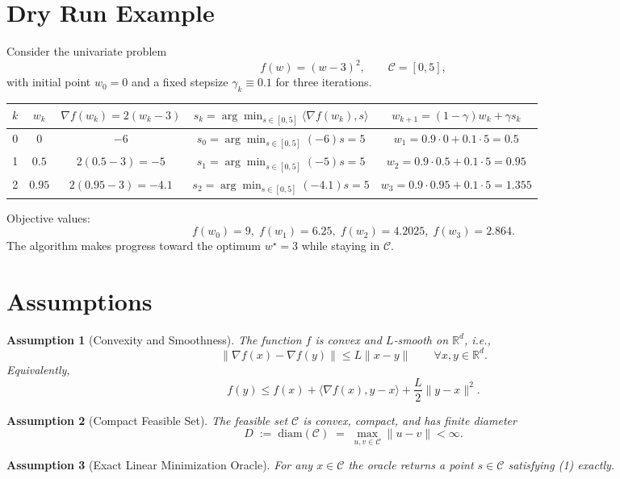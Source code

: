 \documentclass{article}
\newtheorem{assumption}{Assumption}
\newcommand{\diam}{\mathrm{diam}}
\begin{document}
\section*{Dry Run Example}
Consider the univariate problem
\[
f(w) = (w-3)^2 ,\qquad \mathcal{C}= [0,5],
\]
with initial point $w_0=0$ and a fixed stepsize $\gamma_k\equiv 0.1$ for three iterations.

\begin{center}
\begin{tabular}{c|c|c|c|c}
$k$ & $w_k$ & $\nabla f(w_k)=2(w_k-3)$ & $s_k=\arg\min_{s\in[0,5]}\langle\nabla f(w_k),s\rangle$ & $w_{k+1}=(1-\gamma)w_k+\gamma s_k$\\\hline
0 & $0$ & $-6$ & $\displaystyle s_0=\arg\min_{s\in[0,5]}(-6)s=5$ & $w_1=0.9\cdot0+0.1\cdot5=0.5$\\[4pt]
1 & $0.5$ & $2(0.5-3)=-5$ & $s_1=\arg\min_{s\in[0,5]}(-5)s=5$ & $w_2=0.9\cdot0.5+0.1\cdot5=0.95$\\[4pt]
2 & $0.95$ & $2(0.95-3)=-4.1$ & $s_2=\arg\min_{s\in[0,5]}(-4.1)s=5$ & $w_3=0.9\cdot0.95+0.1\cdot5=1.355$\\
\end{tabular}
\end{center}

Objective values:
\[
f(w_0)=9,\; f(w_1)=6.25,\; f(w_2)=4.2025,\; f(w_3)=2.864.
\]
The algorithm makes progress toward the optimum $w^\star=3$ while staying in $\mathcal{C}$.

\newpage
\section*{Assumptions}
\begin{assumption}[Convexity and Smoothness]\label{ass:convex-smooth}
The function $f$ is convex and $L$‑smooth on $\mathbb{R}^d$, i.e.,
\[
\|\nabla f(x)-\nabla f(y)\| \le L\|x-y\|\qquad\forall x,y\in\mathbb{R}^d .
\tag{5}
\]
Equivalently,
\[
f(y) \le f(x)+\langle\nabla f(x),y-x\rangle+\frac{L}{2}\|y-x\|^2 .
\tag{6}
\]
\end{assumption}
\begin{assumption}[Compact Feasible Set]\label{ass:compact}
The feasible set $\mathcal{C}$ is convex, compact, and has finite diameter
\[
D \;:=\; \diam(\mathcal{C}) \;=\; \max_{u,v\in\mathcal{C}}\|u-v\| <\infty .
\tag{7}
\]
\end{assumption}
\begin{assumption}[Exact Linear Minimization Oracle]\label{ass:lmo}
For any $x\in\mathcal{C}$ the oracle returns a point $s\in\mathcal{C}$ satisfying (1) exactly.
\end{assumption}
\end{document}
